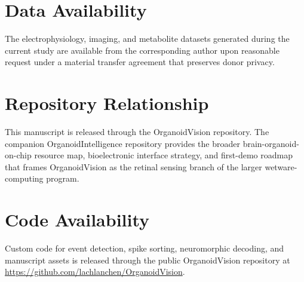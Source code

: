 \documentclass[11pt]{article}
\begin{document}
\section*{Data Availability}
The electrophysiology, imaging, and metabolite datasets generated during the current study are available from the corresponding author upon reasonable request under a material transfer agreement that preserves donor privacy.

\section*{Repository Relationship}
This manuscript is released through the OrganoidVision repository. The companion OrganoidIntelligence repository provides the broader brain-organoid-on-chip resource map, bioelectronic interface strategy, and first-demo roadmap that frames OrganoidVision as the retinal sensing branch of the larger wetware-computing program.\cite{organoidintelligence2026}

\section*{Code Availability}
Custom code for event detection, spike sorting, neuromorphic decoding, and manuscript assets is released through the public OrganoidVision repository at \url{https://github.com/lachlanchen/OrganoidVision}.
\end{document}
